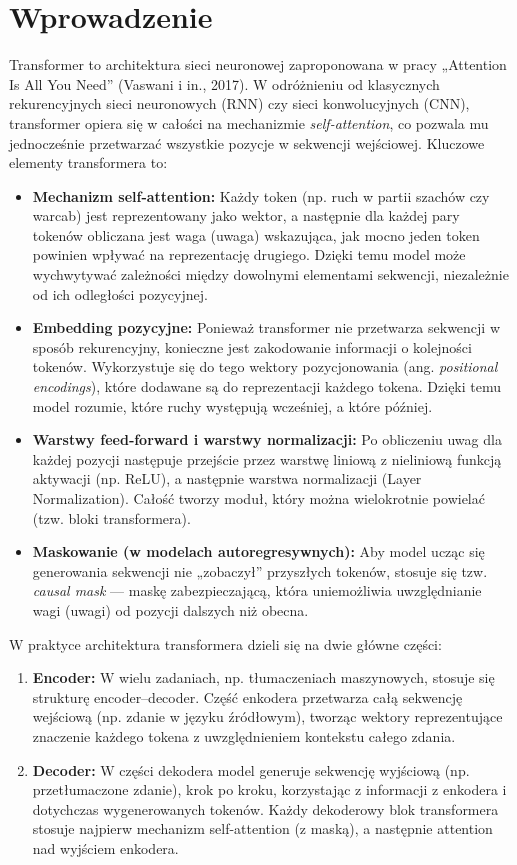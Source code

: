 \documentclass[12pt]{article}
\begin{document}
\section{Wprowadzenie}
Transformer to architektura sieci neuronowej zaproponowana w pracy „Attention Is All You Need” (Vaswani i in., 2017). W odróżnieniu od klasycznych rekurencyjnych sieci neuronowych (RNN) czy sieci konwolucyjnych (CNN), transformer opiera się w całości na mechanizmie \emph{self-attention}, co pozwala mu jednocześnie przetwarzać wszystkie pozycje w sekwencji wejściowej. Kluczowe elementy transformera to:
\begin{itemize}
    \item \textbf{Mechanizm self-attention:} Każdy token (np. ruch w partii szachów czy warcab) jest reprezentowany jako wektor, a następnie dla każdej pary tokenów obliczana jest waga (uwaga) wskazująca, jak mocno jeden token powinien wpływać na reprezentację drugiego. Dzięki temu model może wychwytywać zależności między dowolnymi elementami sekwencji, niezależnie od ich odległości pozycyjnej.
    \item \textbf{Embedding pozycyjne:} Ponieważ transformer nie przetwarza sekwencji w sposób rekurencyjny, konieczne jest zakodowanie informacji o kolejności tokenów. Wykorzystuje się do tego wektory pozycjonowania (ang. \emph{positional encodings}), które dodawane są do reprezentacji każdego tokena. Dzięki temu model rozumie, które ruchy występują wcześniej, a które później.
    \item \textbf{Warstwy feed‐forward i warstwy normalizacji:} Po obliczeniu uwag dla każdej pozycji następuje przejście przez warstwę liniową z nieliniową funkcją aktywacji (np. ReLU), a następnie warstwa normalizacji (Layer Normalization). Całość tworzy moduł, który można wielokrotnie powielać (tzw. bloki transformera).
    \item \textbf{Maskowanie (w modelach autoregresywnych):} Aby model ucząc się generowania sekwencji nie „zobaczył” przyszłych tokenów, stosuje się tzw. \emph{causal mask} — maskę zabezpieczającą, która uniemożliwia uwzględnianie wagi (uwagi) od pozycji dalszych niż obecna.
\end{itemize}

W praktyce architektura transformera dzieli się na dwie główne części:
\begin{enumerate}
    \item \textbf{Encoder:} W wielu zadaniach, np. tłumaczeniach maszynowych, stosuje się strukturę encoder–decoder. Część enkodera przetwarza całą sekwencję wejściową (np. zdanie w języku źródłowym), tworząc wektory reprezentujące znaczenie każdego tokena z uwzględnieniem kontekstu całego zdania.
    \item \textbf{Decoder:} W części dekodera model generuje sekwencję wyjściową (np. przetłumaczone zdanie), krok po kroku, korzystając z informacji z enkodera i dotychczas wygenerowanych tokenów. Każdy dekoderowy blok transformera stosuje najpierw mechanizm self-attention (z maską), a następnie attention nad wyjściem enkodera.
\end{enumerate}
\end{document}
